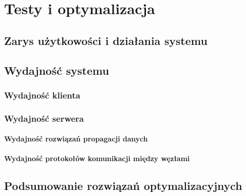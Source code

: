 \chapter{Testy i optymalizacja}
\label{cha:testyIOptymalizacje}

\section{Zarys użytkowości i działania systemu}
\label{sec:UX}

\section{Wydajność systemu}
\label{sec:wydajnosc}

\subsection{Wydajność klienta}
\label{sec:wydajnoscKlient}

\subsection{Wydajność serwera}
\label{sec:wydajnoscNode}

\subsubsection{Wydajność rozwiązań propagacji danych}
\subsubsection{Wydajność protokołów komunikacji między węzłami}

\section{Podsumowanie rozwiązań optymalizacyjnych}
\label{sec:optSummary}


